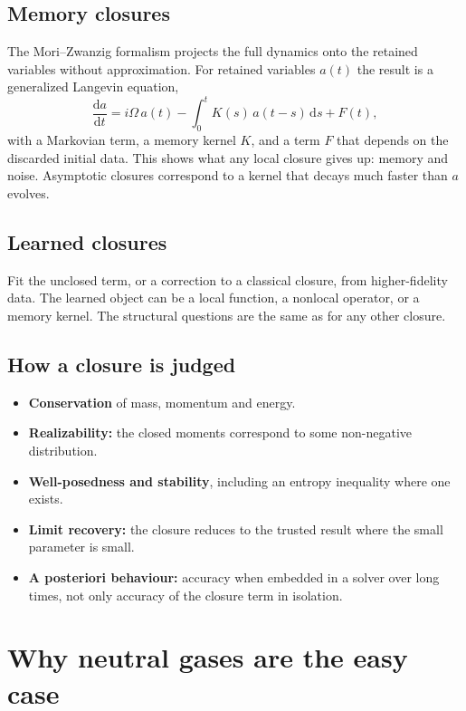 \documentclass[11pt]{article}
\newcommand{\dd}{\mathrm{d}}
\begin{document}
\subsection{Memory closures}

The Mori--Zwanzig formalism projects the full dynamics onto the retained
variables without approximation. For retained variables $a(t)$ the result is
a generalized Langevin equation,
\begin{equation}
  \frac{\dd a}{\dd t} = i\Omega\,a(t)
     - \int_0^t K(s)\,a(t-s)\,\dd s + F(t),
\end{equation}
with a Markovian term, a memory kernel $K$, and a term $F$ that depends on
the discarded initial data. This shows what any local closure gives up:
memory and noise. Asymptotic closures correspond to a kernel that decays much
faster than $a$ evolves.

\subsection{Learned closures}

Fit the unclosed term, or a correction to a classical closure, from
higher-fidelity data. The learned object can be a local function, a nonlocal
operator, or a memory kernel. The structural questions are the same as for
any other closure.

\subsection{How a closure is judged}

\begin{itemize}
  \item \textbf{Conservation} of mass, momentum and energy.
  \item \textbf{Realizability:} the closed moments correspond to some
    non-negative distribution.
  \item \textbf{Well-posedness and stability}, including an entropy
    inequality where one exists.
  \item \textbf{Limit recovery:} the closure reduces to the trusted result
    where the small parameter is small.
  \item \textbf{A posteriori behaviour:} accuracy when embedded in a solver
    over long times, not only accuracy of the closure term in isolation.
\end{itemize}

\section{Why neutral gases are the easy case}
\end{document}

